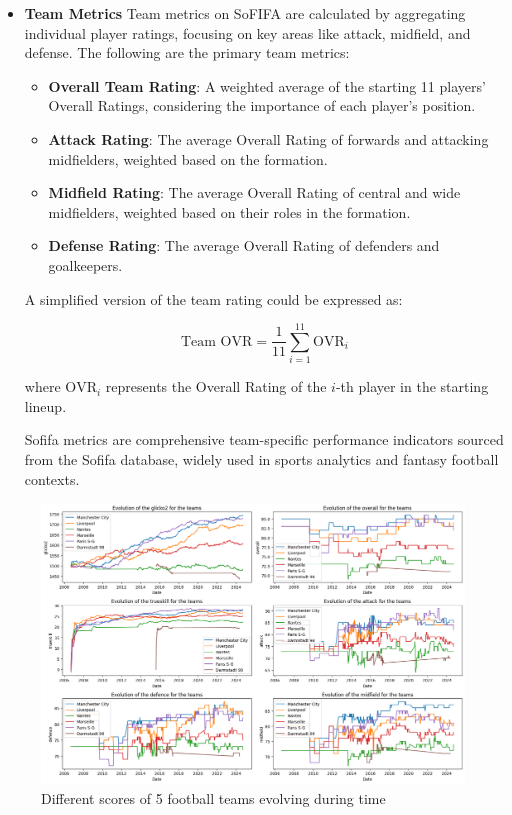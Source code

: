 \begin{itemize}
\item \textbf{Team Metrics}
    Team metrics on SoFIFA are calculated by aggregating individual player ratings, focusing on key areas like attack, midfield, and defense. The following are the primary team metrics:
    
    \begin{itemize}
        \item \textbf{Overall Team Rating}: A weighted average of the starting 11 players' Overall Ratings, considering the importance of each player's position.
        \item \textbf{Attack Rating}: The average Overall Rating of forwards and attacking midfielders, weighted based on the formation.
        \item \textbf{Midfield Rating}: The average Overall Rating of central and wide midfielders, weighted based on their roles in the formation.
        \item \textbf{Defense Rating}: The average Overall Rating of defenders and goalkeepers.
    \end{itemize}
    
    A simplified version of the team rating could be expressed as:
    
    \[
    \text{Team OVR} = \frac{1}{11} \sum_{i=1}^{11} \text{OVR}_i
    \]
    
    where \( \text{OVR}_i \) represents the Overall Rating of the $i$-th player in the starting lineup.
    
    
    Sofifa metrics are comprehensive team-specific performance indicators sourced from the Sofifa database, widely used in sports analytics and fantasy football contexts.
\end{itemize}

\begin{figure}[H]
    \centering
    \includegraphics[width=\textwidth, keepaspectratio]{images/scores_5_teams_during_time.png}
    \caption{Different scores of 5 football teams evolving during time}
    \label{fig:scores_5_teams_during_time}
\end{figure}

